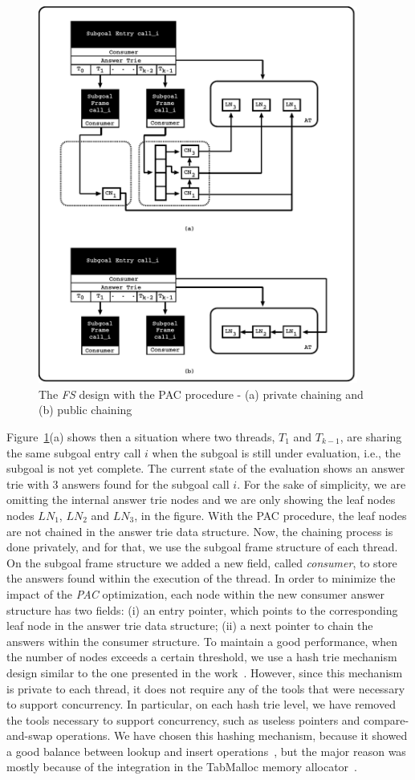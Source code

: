 \documentclass{llncs}
\begin{document}
\begin{figure}[!ht]
\centering
\includegraphics[width=10.5cm]{figures/pcc.pdf}
\caption{The \emph{FS} design with the PAC procedure - (a) private
  chaining and (b) public chaining}
\label{fig_tabtries_pcc}
\end{figure}

Figure~\ref{fig_tabtries_pcc}(a) shows then a situation where two
threads, $T_1$ and $T_{k-1}$, are sharing the same subgoal entry call
$i$ when the subgoal is still under evaluation, i.e., the subgoal is
not yet complete. The current state of the evaluation shows an answer
trie with $3$ answers found for the subgoal call $i$. For the sake of
simplicity, we are omitting the internal answer trie nodes and we are
only showing the leaf nodes nodes $LN_1$, $LN_2$ and $LN_3$, in the
figure. With the PAC procedure, the leaf nodes are not chained in the
answer trie data structure. Now, the chaining process is done
privately, and for that, we use the subgoal frame structure of each
thread. On the subgoal frame structure we added a new field, called
\emph{consumer}, to store the answers found within the execution of
the thread. In order to minimize the impact of the \emph{PAC}
optimization, each node within the new consumer answer structure has
two fields: (i) an entry pointer, which points to the corresponding
leaf node in the answer trie data structure; (ii) a next pointer to
chain the answers within the consumer structure. To maintain a good
performance, when the number of nodes exceeds a certain threshold, we
use a hash trie mechanism design similar to the one presented in the
work~\cite{Areias-ijpp15}. However, since this mechanism is private to
each thread, it does not require any of the tools that were necessary
to support concurrency. In particular, on each hash trie level, we
have removed the tools necessary to support concurrency, such as
useless pointers and compare-and-swap operations. We have chosen this
hashing mechanism, because it showed a good balance between lookup and
insert operations~\cite{Areias-ijpp15}, but the major reason was
mostly because of the integration in the TabMalloc memory
allocator~\cite{Areias-12b}.
\end{document}
